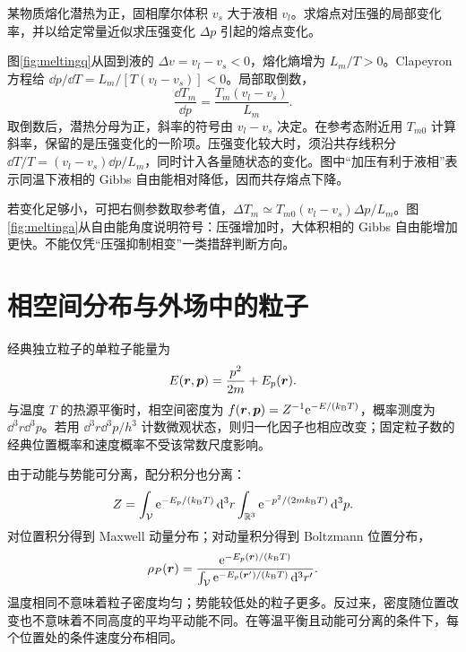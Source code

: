 \begin{example}[熔化曲线的负斜率]
某物质熔化潜热为正，固相摩尔体积 $v_s$ 大于液相 $v_l$。求熔点对压强的局部变化率，并以给定常量近似求压强变化 $\Delta p$ 引起的熔点变化。
\end{example}
\begin{solution}
图\ref{fig:meltingq}从固到液的 $\Delta v=v_l-v_s<0$，熔化熵增为 $L_m/T>0$。Clapeyron 方程给 $\dd p/\dd T=L_m/[T(v_l-v_s)]<0$。局部取倒数，
\[
 \frac{\dd T_m}{\dd p}=\frac{T_m(v_l-v_s)}{L_m}.
\]
取倒数后，潜热分母为正，斜率的符号由 $v_l-v_s$ 决定。在参考态附近用 $T_{m0}$ 计算斜率，保留的是压强变化的一阶项。压强变化较大时，须沿共存线积分 $\dd T/T=(v_l-v_s)\dd p/L_m$，同时计入各量随状态的变化。图中“加压有利于液相”表示同温下液相的 Gibbs 自由能相对降低，因而共存熔点下降。

若变化足够小，可把右侧参数取参考值，$\Delta T_m\simeq T_{m0}(v_l-v_s)\Delta p/L_m$。图\ref{fig:meltinga}从自由能角度说明符号：压强增加时，大体积相的 Gibbs 自由能增加更快。不能仅凭“压强抑制相变”一类措辞判断方向。
\end{solution}

\section{相空间分布与外场中的粒子}
\label{th:phaseprobability}
经典独立粒子的单粒子能量为
\[
 E(\bm{r},\bm{p})=\frac{p^2}{2m}+E_p(\bm{r}).
\]
与温度 $T$ 的热源平衡时，相空间密度为 $f(\bm{r},\bm{p})=Z^{-1}\mathrm e^{-E/(k_{\mathrm B} T)}$，概率测度为 $\dd^3r\dd^3p$。若用 $\dd^3r\dd^3p/h^3$ 计数微观状态，则归一化因子也相应改变；固定粒子数的经典位置概率和速度概率不受该常数尺度影响。

由于动能与势能可分离，配分积分也分离：
\[
 Z=\int_{\cal V}\mathrm e^{-E_p/(k_{\mathrm B} T)}\mathop{}\!\mathrm d^3r
 \int_{\mathbb R^3}\mathrm e^{-p^2/(2mk_{\mathrm B} T)}\mathop{}\!\mathrm d^3p.
\]
对位置积分得到 Maxwell 动量分布；对动量积分得到 Boltzmann 位置分布，
\begin{equation}\label{eq:boltzmannposition}
 \rho_P(\bm{r})=\frac{\mathrm e^{-E_p(\bm{r})/(k_{\mathrm B} T)}}
 {\int_{\cal V}\mathrm e^{-E_p(\bm{r}')/(k_{\mathrm B} T)}\mathop{}\!\mathrm d^3r'}.
\end{equation}
温度相同不意味着粒子密度均匀；势能较低处的粒子更多。反过来，密度随位置改变也不意味着不同高度的平均平动能不同。在等温平衡且动能可分离的条件下，每个位置处的条件速度分布相同。

